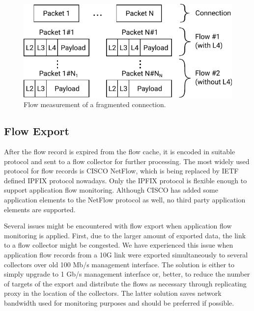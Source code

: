 \begin{figure}[t!]
  \begin{center}
    \includegraphics[width=\textwidth]{figures/fragmented-flow}
  \end{center}
  \caption{Flow measurement of a fragmented connection.}
  \label{fig:fragmented-flow}
\end{figure}

\subsection{Flow Export}


After the flow record is expired from the flow cache, it is encoded in suitable protocol and sent to a flow collector for further processing. The most widely used protocol for flow records is CISCO NetFlow, which is being replaced by IETF defined IPFIX protocol nowadays. Only the IPFIX protocol is flexible enough to support application flow monitoring. Although CISCO has added some application elements to the NetFlow protocol as well, no third party application elements are supported.

Several issues might be encountered with flow export when application flow monitoring is applied. First, due to the larger amount of exported data, the link to a flow collector might be congested. We have experienced this issue when application flow records from a 10G link were exported simultaneously to several collectors over old 100 Mb/s management interface. The solution is either to simply upgrade to 1 Gb/s management interface or, better, to reduce the number of targets of the export and distribute the flows as necessary through replicating proxy in the location of the collectors. The latter solution saves network bandwidth used for monitoring purposes and should be preferred if possible.

